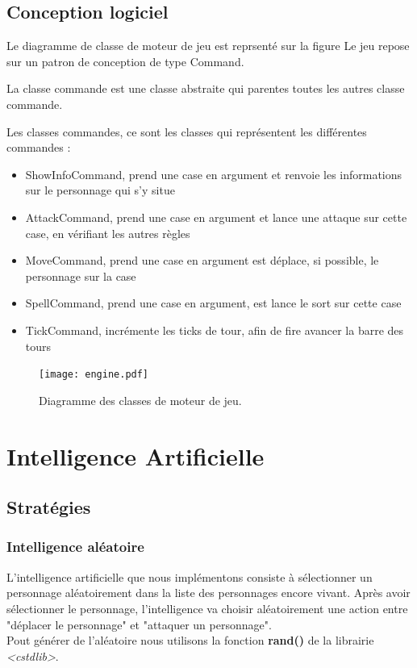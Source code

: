 \documentclass[a4paper,12pt]{article}
\begin{document}
\clearpage
\subsection{Conception logiciel}

Le diagramme de classe de moteur de jeu est reprsenté sur la figure %
Le jeu repose sur un patron de conception de type Command.

La classe commande est une classe abstraite qui parentes toutes les autres classe commande.

Les classes commandes, ce sont les classes qui représentent les différentes commandes :

\begin{itemize}
  \item ShowInfoCommand, prend une case en argument et renvoie les informations sur le personnage qui s'y situe 
  \item AttackCommand, prend une case en argument et lance une attaque sur cette case, en vérifiant les autres règles
  \item MoveCommand, prend une case en argument est déplace, si possible, le personnage sur la case
  \item SpellCommand, prend une case en argument, est lance le sort sur cette case 
  \item TickCommand, incrémente les ticks de tour, afin de fire avancer la barre des tours
\end{itemize}


\begin{landscape}
\begin{figure}[p]
\texttt{[image: engine.pdf]}
\caption{\label{uml:engine}Diagramme des classes de moteur de jeu.} 
\end{figure}
\end{landscape}


\section{Intelligence Artificielle}

\subsection{Stratégies}
\subsubsection{Intelligence aléatoire}
L'intelligence artificielle que nous implémentons consiste à sélectionner un personnage aléatoirement dans la liste des personnages encore vivant. Après avoir sélectionner le personnage, l'intelligence va choisir aléatoirement une action entre "déplacer le personnage" et "attaquer un personnage".\\
Pout générer de l'aléatoire nous utilisons la fonction \textbf{rand()} de la librairie \textit{<cstdlib>}.
\end{document}
